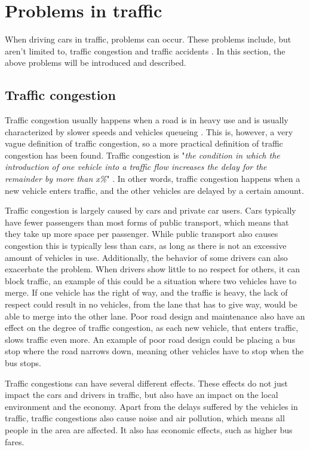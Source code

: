 \section{Problems in traffic}\label{probana:problemsTraffic}
When driving cars in traffic, problems can occur.
These problems include, but aren't limited to, traffic congestion and traffic accidents \cite{annual_accident_report_2018, bull_urban_2002}.
In this section, the above problems will be introduced and described.

\subsection{Traffic congestion}
Traffic congestion usually happens when a road is in heavy use and is usually characterized by slower speeds and vehicles queueing \cite{bull_traffic_2003}.
This is, however, a very vague definition of traffic congestion, so a more practical definition of traffic congestion has been found.
Traffic congestion is "\textit{the condition in which the introduction of one vehicle into a traffic flow increases the delay for the remainder by more than x\%}" \cite{bull_urban_2002}.
In other words, traffic congestion happens when a new vehicle enters traffic, and the other vehicles are delayed by a certain amount.

Traffic congestion is largely caused by cars and private car users.
Cars typically have fewer passengers than most forms of public transport, which means that they take up more space per passenger.
While public transport also causes congestion this is typically less than cars, as long as there is not an excessive amount of vehicles in use.
Additionally, the behavior of some drivers can also exacerbate the problem.
When drivers show little to no respect for others, it can block traffic, an example of this could be a situation where two vehicles have to merge.
If one vehicle has the right of way, and the traffic is heavy, the lack of respect could result in no vehicles, from the lane that has to give way, would be able to merge into the other lane.
Poor road design and maintenance also have an effect on the degree of traffic congestion, as each new vehicle, that enters traffic, slows traffic even more.
An example of poor road design could be placing a bus stop where the road narrows down, meaning other vehicles have to stop when the bus stops.
\cite{bull_urban_2002, bull_traffic_2003, ukpata_traffic_2012}

Traffic congestions can have several different effects.
These effects do not just impact the cars and drivers in traffic, but also have an impact on the local environment and the economy.
Apart from the delays suffered by the vehicles in traffic, traffic congestions also cause noise and air pollution, which means all people in the area are affected.
It also has economic effects, such as higher bus fares.
\cite{bull_urban_2002, bull_traffic_2003}

